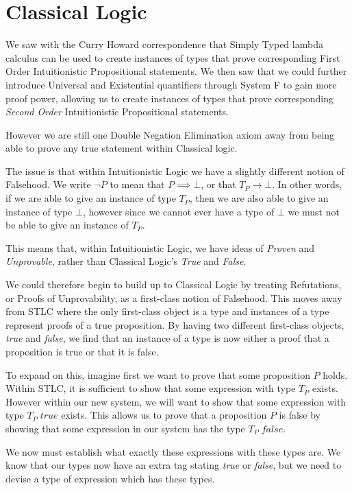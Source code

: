\documentclass{article}
\begin{document}
\newpage
\section{Classical Logic}

We saw with the Curry Howard correspondence that Simply Typed lambda calculus can be used to create instances of types that prove corresponding First Order Intuitionistic Propositional statements. We then saw that we could further introduce Universal and Existential quantifiers through System F to gain more proof power, allowing us to create instances of types that prove corresponding \textit{Second Order} Intuitionistic Propositional statements.

However we are still one Double Negation Elimination axiom away from being able to prove any true statement within Classical logic.

The issue is that within Intuitionistic Logic we have a slightly different notion of Falsehood. We write $\lnot P$ to mean that $P \implies \bot$, or that $T_P \to \bot$. In other words, if we are able to give an instance of type $T_P$, then we are also able to give an instance of type $\bot$, however since we cannot ever have a type of $\bot$ we must not be able to give an instance of $T_P$.

This means that, within Intuitionistic Logic, we have ideas of \textit{Proven} and \textit{Unprovable}, rather than Classical Logic's \textit{True} and \textit{False}.

We could therefore begin to build up to Classical Logic by treating Refutations, or Proofs of Unprovability, as a first-class notion of Falsehood. This moves away from STLC where the only first-class object is a type and instances of a type represent proofs of a true proposition. By having two different first-class objects, \textit{true} and \textit{false}, we find that an instance of a type is now either a proof that a proposition is true or that it is false.

To expand on this, imagine first we want to prove that some proposition $P$ holds. Within STLC, it is sufficient to show that some expression with type $T_P$ exists. However within our new system, we will want to show that some expression with type $T_P \; true$ exists. This allows us to prove that a proposition $P$ is false by showing that some expression in our system has the type $T_P \; false$.

We now must establish what exactly these expressions with these types are. We know that our types now have an extra tag stating \textit{true} or \textit{false}, but we need to devise a type of expression which has these types.
\end{document}
